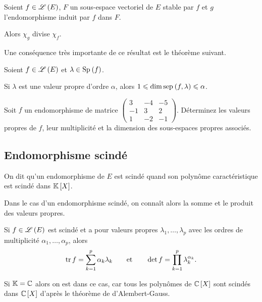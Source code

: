 \begin{prop}
Soient \(f\in\mathscr{L}\left(E\right)\), \(F\) un sous-espace vectoriel de \(E\) stable par \(f\) et \(g\) l'endomorphisme induit par \(f\) dans \(F\).

Alors \(\chi_g\) divise \(\chi_f\).
\end{prop}

Une conséquence très importante de ce résultat est le théorème suivant.

\begin{theo}
Soient \(f\in\mathscr{L}\left(E\right)\) et \(\lambda\in\Sp{f}\).

Si \(\lambda\) est une valeur propre d'ordre \(\alpha\), alors \(1\leq\dim\sep{f}{\lambda}\leq\alpha\).
\end{theo}

\begin{exo}
Soit \(f\) un endomorphisme de matrice \(\begin{pmatrix}
3 & -4 & -5 \\
-1 & 3 & 2 \\
1 & -2 & -1
\end{pmatrix}\). Déterminez les valeurs propres de \(f\), leur multiplicité et la dimension des sous-espaces propres associés.
\end{exo}

\subsection{Endomorphisme scindé}

\begin{defi}
On dit qu'un endomorphisme de \(E\) est scindé quand son polynôme caractéristique est scindé dans \(\poly\).
\end{defi}

Dans le cas d'un endomorphisme scindé, on connaît alors la somme et le produit des valeurs propres.

\begin{prop}
Si \(f\in\mathscr{L}\left(E\right)\) est scindé et a pour valeurs propres \(\lambda_1,\dots,\lambda_p\) avec les ordres de multiplicité \(\alpha_1,\dots,\alpha_p\), alors \[\operatorname{tr} f=\sum_{k=1}^p\alpha_k\lambda_k\qquad\text{et}\qquad\det f=\prod_{k=1}^p\lambda_k^{\alpha_k}.\]
\end{prop}

Si \(\mathbb{K}=\mathbb{C}\) alors on est dans ce cas, car tous les polynômes de \(\poly[\C]\) sont scindés dans \(\poly[\C]\) d'après le théorème de d'Alembert-Gauss.


